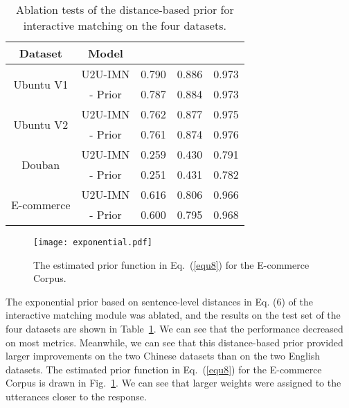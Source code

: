 \documentclass[journal]{IEEEtran}
\begin{document}
    \begin{table}[!hbt]
    \small
    \caption{Ablation tests of the distance-based prior for interactive matching on the four datasets.}
    \centering
    \begin{tabular}{c|c|c|c|c}
    \toprule
     Dataset                    & Model &  &  &   \\
    \hline
    \multirow{2}{*}{Ubuntu V1}  & U2U-IMN              & 0.790 & 0.886 & 0.973  \\
                                & - Prior              & 0.787 & 0.884 & 0.973  \\
    \hline
    \multirow{2}{*}{Ubuntu V2}  & U2U-IMN              & 0.762 & 0.877 & 0.975  \\
                                & - Prior              & 0.761 & 0.874 & 0.976  \\
    \hline
    \multirow{2}{*}{Douban}     & U2U-IMN              & 0.259 & 0.430 & 0.791  \\
                                & - Prior              & 0.251 & 0.431 & 0.782  \\
    \hline
    \multirow{2}{*}{E-commerce} & U2U-IMN              & 0.616 & 0.806 & 0.966  \\
                                & - Prior              & 0.600 & 0.795 & 0.968  \\
    \bottomrule
    \end{tabular}
    \label{tab6}
    \end{table}


    \begin{figure}[t]
    \centering
    \texttt{[image: exponential.pdf]}
    \caption{The estimated prior function  in Eq.~(\ref{equ8}) for the E-commerce Corpus.}
    \label{fig4}
    \end{figure}

    The exponential prior based on sentence-level distances in Eq. (6) of the interactive matching module was ablated, and the results on the test set of the four datasets are shown in Table~\ref{tab6}.
    We can see that the performance decreased on most metrics.
    Meanwhile, we can see that this distance-based prior provided larger improvements on the two Chinese datasets than on the two English datasets.
    The estimated prior function  in Eq.~(\ref{equ8}) for the E-commerce Corpus is drawn in Fig.~\ref{fig4}. We can see that larger weights were assigned to the utterances closer to the response.
\end{document}
